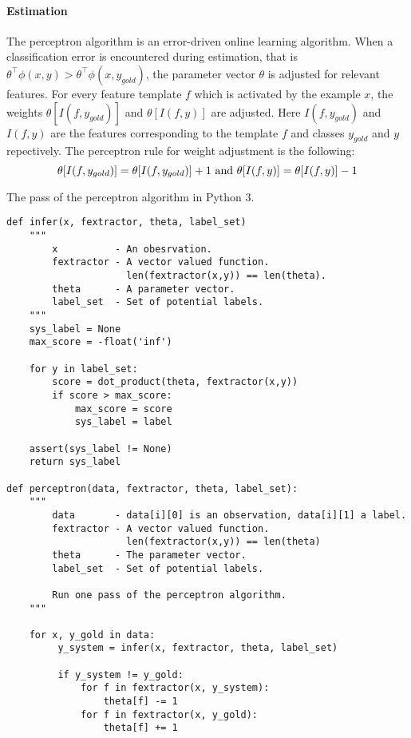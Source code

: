 \paragraph{Estimation} The perceptron algorithm is an error-driven
online learning algorithm. When a classification error is encountered
during estimation, that is $\theta^\top\phi(x,y) >
\theta^\top\phi(x,y_{gold})$, the parameter vector $\theta$ is
adjusted for relevant features. For every feature template $f$ which
is activated by the example $x$, the weights $\theta[I(f, y_{gold})]$
and $\theta[I(f, y)]$ are adjusted. Here $I(f, y_{gold})$ and $I(f,
y)$ are the features corresponding to the template $f$ and classes
$y_{gold}$ and $y$ repectively. The perceptron rule for weight
adjustment is the following:
$$\theta[I(f, y_{gold})] = \theta[I(f, y_{gold})] + 1 {\rm\ and\ }\theta[I(f, y)] = \theta[I(f, y)] - 1$$

\begin{algorithm}[!p]
\begin{center}
\caption{The pass of the perceptron algorithm in Python 3.}\label{forward-algorithm}
\begin{lstlisting}[linewidth=\textwidth]
def infer(x, fextractor, theta, label_set)
    """
        x          - An obesrvation.
        fextractor - A vector valued function. 
                     len(fextractor(x,y)) == len(theta). 
        theta      - A parameter vector.
        label_set  - Set of potential labels. 
    """
    sys_label = None
    max_score = -float('inf')
 
    for y in label_set:
        score = dot_product(theta, fextractor(x,y))
        if score > max_score:
            max_score = score
            sys_label = label

    assert(sys_label != None)
    return sys_label

def perceptron(data, fextractor, theta, label_set): 
    """
        data       - data[i][0] is an observation, data[i][1] a label.
        fextractor - A vector valued function. 
                     len(fextractor(x,y)) == len(theta) 
        theta      - The parameter vector.
        label_set  - Set of potential labels. 

        Run one pass of the perceptron algorithm.
    """

    for x, y_gold in data:
         y_system = infer(x, fextractor, theta, label_set)
         
         if y_system != y_gold:
             for f in fextractor(x, y_system):
                 theta[f] -= 1
             for f in fextractor(x, y_gold):
                 theta[f] += 1
\end{lstlisting}
\end{center}
\end{algorithm}

